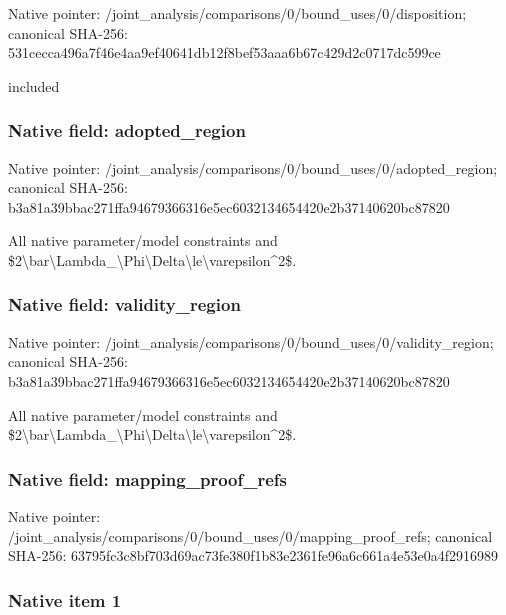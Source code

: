 \documentclass[10pt,a4paper]{article}
\begin{document}
Native pointer: /joint\_analysis/comparis\allowbreak{}ons/0/bound\_uses/0/dispo\allowbreak{}sition; canonical SHA-256: 531cecca496a7f46e4aa9ef4\allowbreak{}0641db12f8bef53aaa6b67c4\allowbreak{}29d2c0717dc599ce


included


\subsubsection{Native field: adopted\_region}


Native pointer: /joint\_analysis/comparis\allowbreak{}ons/0/bound\_uses/0/adopt\allowbreak{}ed\_region; canonical SHA-256: b3a81a39bbac271ffa946793\allowbreak{}66316e5ec6032134654420e2\allowbreak{}b37140620bc87820


All native parameter/model constraints and \$2\textbackslash{}bar\textbackslash{}Lambda\_\textbackslash{}Phi\textbackslash{}Delta\allowbreak{}\textbackslash{}le\textbackslash{}varepsilon\textasciicircum{}2\$.


\subsubsection{Native field: validity\_region}


Native pointer: /joint\_analysis/comparis\allowbreak{}ons/0/bound\_uses/0/valid\allowbreak{}ity\_region; canonical SHA-256: b3a81a39bbac271ffa946793\allowbreak{}66316e5ec6032134654420e2\allowbreak{}b37140620bc87820


All native parameter/model constraints and \$2\textbackslash{}bar\textbackslash{}Lambda\_\textbackslash{}Phi\textbackslash{}Delta\allowbreak{}\textbackslash{}le\textbackslash{}varepsilon\textasciicircum{}2\$.


\subsubsection{Native field: mapping\_proof\_refs}


Native pointer: /joint\_analysis/comparis\allowbreak{}ons/0/bound\_uses/0/mappi\allowbreak{}ng\_proof\_refs; canonical SHA-256: 63795fc3c8bf703d69ac73fe\allowbreak{}380f1b83e2361fe96a6c661a\allowbreak{}4e53e0a4f2916989



\subsubsection{Native item 1}
\end{document}
